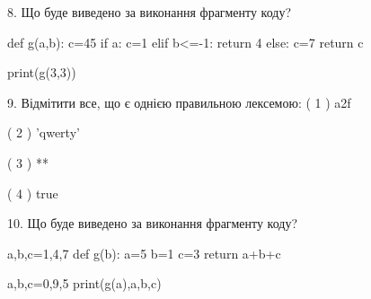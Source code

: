 \documentclass[11pt]{article}
\begin{document}
8. Що буде виведено за виконання фрагменту коду?

def g(a,b):
    c=45
    if a:
        c=1
    elif b<=-1:
         return 4
    else: 
        c=7
    return c

print(g(3,3))
\vspace{5mm}

9. %
Відмітити все, що є однією правильною лексемою:
( 1 ) a2f

( 2 ) 'qwerty'

( 3 ) **

( 4 ) true
\vspace{5mm}

10. Що буде виведено за виконання фрагменту коду?

a,b,c=1,4,7
def g(b):
    a=5
    b=1
    c=3
    return a+b+c

a,b,c=0,9,5
print(g(a),a,b,c)
\vspace{5mm}

\newpage
\end{document}
